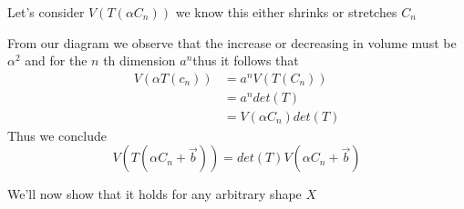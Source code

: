 \documentclass[11pt]{book}
\begin{document}
\begin{remark}
    Let's consider $V\left(T\left(\alpha C_{n} \right) \right) $ we know this either shrinks or stretches $C_{n} $ 
    \begin{center}
    \end{center}
    From our diagram we observe that the increase or decreasing in volume must be $\alpha ^2 $ and for the $n$ th dimension $a^{n} $thus it follows that 
    \begin{align*}
        V\left(\alpha T\left(c_{n} \right) \right) &= a^{n} V\left(T\left(C_{n} \right) \right)   \\ 
        &= a^{n} \mathit{det} \left(T\right)  \\
        &= V\left(\alpha C_{n} \right) \mathit{det} \left(T\right)  
    \end{align*}
    Thus we conclude 
    \begin{equation*}
        V\left(T\left(\alpha C_{n}  + \vec{b} \right) \right) = \mathit{det} \left(T\right) V\left(\alpha C_{n}  + \vec{b} \right) 
    \end{equation*}
\end{remark}

We'll now show that it holds for any arbitrary shape $X$ 
\end{document}

